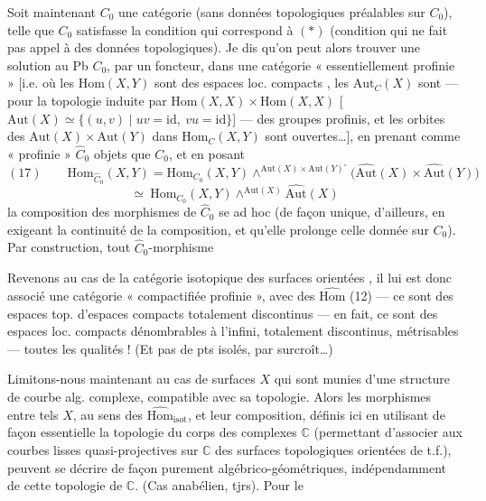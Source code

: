 \documentclass[11pt,a4paper]{article}
\begin{document}
Soit maintenant $C_{0}$ une catégorie (sans données topologiques préalables sur $C_{0}$), telle que $C_{0}$ satisfasse la condition qui correspond à $(*)$ (condition qui ne fait pas appel à des données topologiques). Je dis qu'on peut alors trouver une solution au Pb  $C_{0}$, par un foncteur, dans une catégorie  « essentiellement profinie »
[i.e. où les $\mathrm{Hom}(X,Y)$ sont des espaces loc. compacts , les $\mathrm{Aut}_{C}(X)$ sont — pour la topologie induite par $\mathrm{Hom}(X,X)\times\mathrm{Hom}(X,X)$ [$\mathrm{Aut}(X)\simeq\{(u,v)\mid uv=\mathrm{id},\ vu=\mathrm{id}\}$] — des groupes profinis, et les orbites des $\mathrm{Aut}(X)\times\mathrm{Aut}(Y)$ dans $\mathrm{Hom}_{C}(X,Y)$ sont ouvertes…], en prenant comme «  profinie » $\widehat{C}_{0}$ \struck{\ill{}}  objets que $C_{0}$, et en posant
\[
  (17)\qquad \mathrm{Hom}_{\widehat{C}_{0}}(X,Y)=\mathrm{Hom}_{C_{0}}(X,Y)\wedge^{\mathrm{Aut}(X)\times\mathrm{Aut}(Y)^{\circ}}\bigl(\widehat{\mathrm{Aut}}(X)\times\widehat{\mathrm{Aut}}(Y)\bigr)
\]
\[
  \simeq\ \mathrm{Hom}_{C_{0}}(X,Y)\wedge^{\mathrm{Aut}(X)}\widehat{\mathrm{Aut}}(X)
\]
la composition des morphismes de $\widehat{C}_{0}$ se  ad hoc (de façon unique, d'ailleurs, en exigeant la continuité de la composition, et qu'elle prolonge celle donnée sur $C_{0}$). Par construction, tout $\widehat{C}_{0}$-morphisme

Revenons au cas de la catégorie isotopique des surfaces orientées  , il lui est donc associé une catégorie « compactifiée profinie », avec des $\widehat{\mathrm{Hom}}$  \struck{\ill{}} (12) — ce sont des espaces  top. d'espaces compacts totalement discontinus — en fait, ce sont des espaces loc. compacts dénombrables à l'infini, totalement discontinus, métrisables — toutes les qualités ! (Et pas de pts isolés, par surcroît…)

Limitons-nous maintenant au cas de surfaces $X$ qui sont munies d'une structure de courbe alg. complexe, compatible avec sa topologie. Alors les morphismes entre tels $X$, au sens des $\widehat{\mathrm{Hom}}_{\mathrm{isot}}$, et leur composition, définis ici en utilisant de façon essentielle la topologie du corps des complexes $\mathbb{C}$ (permettant d'associer aux  courbes lisses quasi-projectives sur $\mathbb{C}$ des surfaces topologiques orientées de t.f.), peuvent se décrire de façon purement algébrico-géométriques, indépendamment de cette topologie de $\mathbb{C}$. (Cas anabélien, tjrs). Pour le
\end{document}
